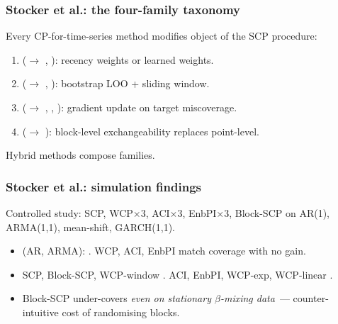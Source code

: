 \documentclass[11pt, aspectratio=169, xcolor={dvipsnames}, usepdftitle=false]{beamer}
\begin{document}
\begin{frame}
\frametitle{Stocker et al.: the four-family taxonomy}
Every CP-for-time-series method modifies  object of the SCP procedure:
\begin{enumerate}
\item {} ($\to$ , ): recency weights or learned weights.
\item {} ($\to$ , ): bootstrap LOO + sliding window.
\item {} ($\to$ , , ): gradient update on target miscoverage.
\item {} ($\to$ ): block-level exchangeability replaces point-level.
\end{enumerate}
 Hybrid methods compose families.
\end{frame}

\begin{frame}
\frametitle{Stocker et al.: simulation findings}
Controlled study: SCP, WCP$\times$3, ACI$\times$3, EnbPI$\times$3, Block-SCP on AR(1), ARMA(1,1), mean-shift, GARCH(1,1).
\begin{itemize}
\item {} (AR, ARMA): . WCP, ACI, EnbPI match coverage with no gain.
\item {} SCP, Block-SCP, WCP-window . ACI, EnbPI, WCP-exp, WCP-linear .
\item {} Block-SCP under-covers \emph{even on stationary $\beta$-mixing data}~--- counter-intuitive cost of randomising blocks.
\end{itemize}
\end{frame}
\end{document}
